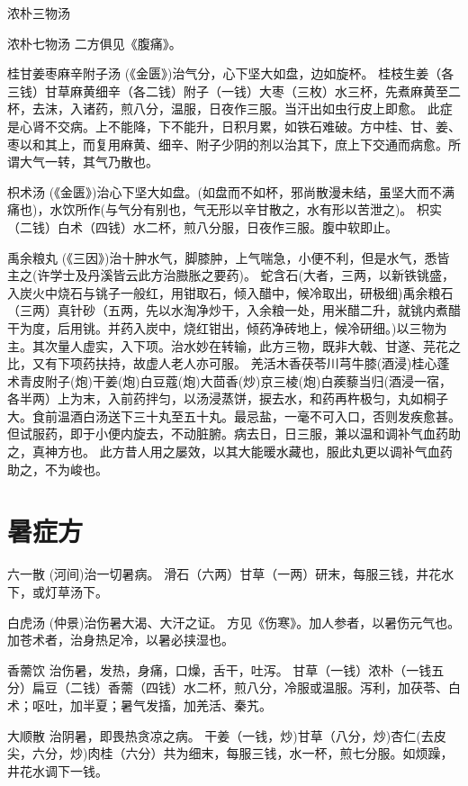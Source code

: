 \documentclass[a4paper,12pt,UTF8,twoside]{ctexbook}
\begin{document}
	浓朴三物汤
	
	浓朴七物汤
	二方俱见《腹痛》。
	
	桂甘姜枣麻辛附子汤
	(《金匮》)治气分，心下坚大如盘，边如旋杯。
	桂枝生姜（各三钱）甘草麻黄细辛（各二钱）附子（一钱）大枣（三枚）水三杯，先煮麻黄至二杯，去沫，入诸药，煎八分，温服，日夜作三服。当汗出如虫行皮上即愈。
	此症是心肾不交病。上不能降，下不能升，日积月累，如铁石难破。方中桂、甘、姜、枣以和其上，而复用麻黄、细辛、附子少阴的剂以治其下，庶上下交通而病愈。所谓大气一转，其气乃散也。
	
	枳术汤
	(《金匮》)治心下坚大如盘。(如盘而不如杯，邪尚散漫未结，虽坚大而不满痛也)，水饮所作(与气分有别也，气无形以辛甘散之，水有形以苦泄之)。
	枳实（二钱）白术（四钱）水二杯，煎八分服，日夜作三服。腹中软即止。
	
	禹余粮丸
	(《三因》)治十肿水气，脚膝肿，上气喘急，小便不利，但是水气，悉皆主之(许学士及丹溪皆云此方治臌胀之要药)。
	蛇含石(大者，三两，以新铁铫盛，入炭火中烧石与铫子一般红，用钳取石，倾入醋中，候冷取出，研极细)禹余粮石（三两）真针砂（五两，先以水淘净炒干，入余粮一处，用米醋二升，就铫内煮醋干为度，后用铫。并药入炭中，烧红钳出，倾药净砖地上，候冷研细。)以三物为主。其次量人虚实，入下项。治水妙在转输，此方三物，既非大戟、甘遂、芫花之比，又有下项药扶持，故虚人老人亦可服。
	羌活木香茯苓川芎牛膝(酒浸)桂心蓬术青皮附子(炮)干姜(炮)白豆蔻(炮)大茴香(炒)京三棱(炮)白蒺藜当归(酒浸一宿，各半两）上为末，入前药拌匀，以汤浸蒸饼，捩去水，和药再杵极匀，丸如桐子大。食前温酒白汤送下三十丸至五十丸。最忌盐，一毫不可入口，否则发疾愈甚。但试服药，即于小便内旋去，不动脏腑。病去日，日三服，兼以温和调补气血药助之，真神方也。
	此方昔人用之屡效，以其大能暖水藏也，服此丸更以调补气血药助之，不为峻也。
	
	

	\chapter{暑症方}	
	
	六一散
	(河间)治一切暑病。
	滑石（六两）甘草（一两）研末，每服三钱，井花水下，或灯草汤下。
	
	白虎汤
	(仲景)治伤暑大渴、大汗之证。
	方见《伤寒》。加人参者，以暑伤元气也。加苍术者，治身热足冷，以暑必挟湿也。
	
	香薷饮
	治伤暑，发热，身痛，口燥，舌干，吐泻。
	甘草（一钱）浓朴（一钱五分）扁豆（二钱）香薷（四钱）水二杯，煎八分，冷服或温服。泻利，加茯苓、白术；呕吐，加半夏；暑气发搐，加羌活、秦艽。
	
	大顺散
	治阴暑，即畏热贪凉之病。
	干姜（一钱，炒)甘草（八分，炒)杏仁(去皮尖，六分，炒)肉桂（六分）共为细末，每服三钱，水一杯，煎七分服。如烦躁，井花水调下一钱。
	
\end{document}
